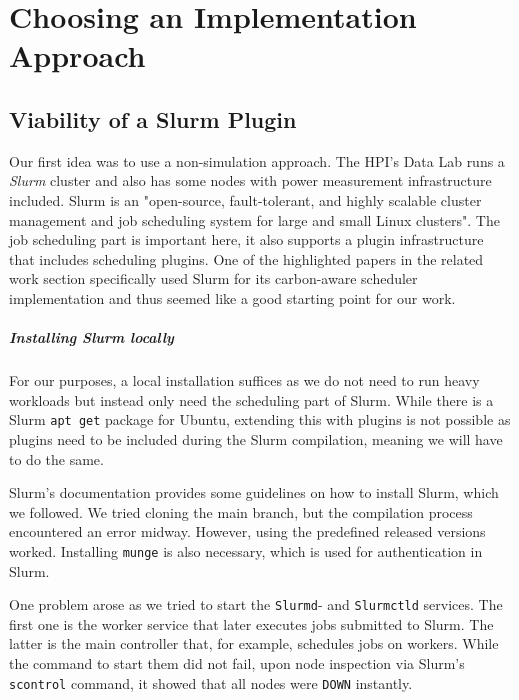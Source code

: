 \chapter{Choosing an Implementation Approach}

\section{Viability of a Slurm Plugin}
\label{subsec:slurm_plugin}

Our first idea was to use a non-simulation approach. 
The HPI's Data Lab runs a \emph{Slurm} cluster and also has some nodes with power measurement infrastructure included. 
Slurm is an "open-source, fault-tolerant, and highly scalable cluster management and job scheduling system for large and small Linux clusters".
The job scheduling part is important here, it also supports a plugin infrastructure that includes scheduling plugins. 
One of the highlighted papers\cite{inigo_goiri_greenslot_2011} in the related work section specifically used Slurm for its carbon-aware scheduler implementation and thus seemed like a good starting point for our work.

\paragraph{Installing Slurm locally}

For our purposes, a local installation suffices as we do not need to run heavy workloads but instead only need the scheduling part of Slurm. 
While there is a Slurm \verb|apt get| package for Ubuntu, extending this with plugins is not possible as plugins need to be included during the Slurm compilation, meaning we will have to do the same.

Slurm's documentation provides some guidelines on how to install Slurm, which we followed. 
We tried cloning the main branch, but the compilation process encountered an error midway. However, using the predefined released versions worked.
Installing \verb|munge| is also necessary, which is used for authentication in Slurm.

One problem arose as we tried to start the \verb|Slurmd|- and \verb|Slurmctld| services. The first one is the worker service that later executes jobs submitted to Slurm. The latter is the main controller that, for example, schedules jobs on workers. While the command to start them did not fail, upon node inspection via Slurm's \verb|scontrol| command, it showed that all nodes were \verb|DOWN| instantly.

